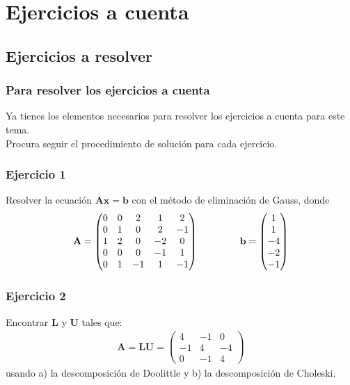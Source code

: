 \section{Ejercicios a cuenta}
\subsection{Ejercicios a resolver}
\begin{frame}
\frametitle{Para resolver los ejercicios a cuenta}
Ya tienes los elementos necesarios para resolver los ejercicios a cuenta para este tema.
\\
\bigskip
Procura seguir el procedimiento de solución para cada ejercicio.
\end{frame}
\begin{frame}
\frametitle{Ejercicio 1}
Resolver la ecuación $\mathbf{Ax} = \mathbf{b}$ con el método de eliminación de Gauss, donde
\begin{align*}
\mathbf{A} =
\begin{pmatrix}
0 & 0 & 2 & 1 & 2 \\
0 & 1 & 0 & 2 & -1 \\
1 & 2 & 0 & -2 & 0 \\
0 & 0 & 0 & -1 & 1 \\
0 & 1 & -1 & 1 & -1
\end{pmatrix} \hspace{1.5cm}
\mathbf{b} =	
\begin{pmatrix}
1 \\
1 \\
-4 \\
-2 \\
-1
\end{pmatrix}
\end{align*}
\end{frame}
\begin{frame}
\frametitle{Ejercicio 2}
Encontrar $\mathbf{L}$ y $\mathbf{U}$ tales que:
\begin{align*}
\mathbf{A} = \mathbf{LU} =
\begin{pmatrix}
4 & -1 & 0 \\
-1 & 4 & -4 \\
0 & -1 & 4
\end{pmatrix}
\end{align*}
usando a) la descomposición de Doolittle y b) la descomposición de Choleski.
\end{frame}
